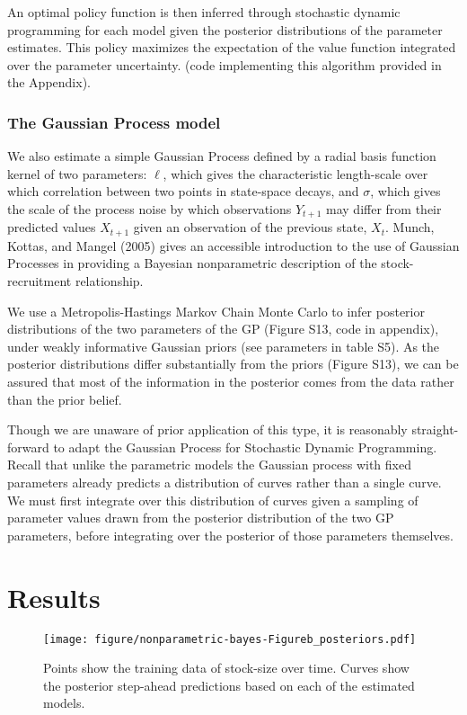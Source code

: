 \documentclass[author-year, review]{elsarticle} %
\makeatletter
\def\maxwidth{\ifdim\Gin@nat@width>\linewidth\linewidth
\else\Gin@nat@width\fi}
\let\Oldincludegraphics\includegraphics
\renewcommand{\includegraphics}[1]{\Oldincludegraphics[width=\maxwidth]{#1}}
\makeatother
\begin{document}
An optimal policy function is then inferred through stochastic dynamic
programming for each model given the posterior distributions of the
parameter estimates. This policy maximizes the expectation of the value
function integrated over the parameter uncertainty. (code implementing
this algorithm provided in the Appendix).

\subsubsection{The Gaussian Process
model}\label{the-gaussian-process-model}

We also estimate a simple Gaussian Process defined by a radial basis
function kernel of two parameters: $\ell$, which gives the
characteristic length-scale over which correlation between two points in
state-space decays, and $\sigma$, which gives the scale of the process
noise by which observations $Y_{t+1}$ may differ from their predicted
values $X_{t+1}$ given an observation of the previous state, $X_t$.
Munch, Kottas, and Mangel (2005) gives an accessible introduction to the
use of Gaussian Processes in providing a Bayesian nonparametric
description of the stock-recruitment relationship.

We use a Metropolis-Hastings Markov Chain Monte Carlo to infer posterior
distributions of the two parameters of the GP (Figure S13, code in
appendix), under weakly informative Gaussian priors (see parameters in
table S5). As the posterior distributions differ substantially from the
priors (Figure S13), we can be assured that most of the information in
the posterior comes from the data rather than the prior belief.

Though we are unaware of prior application of this type, it is
reasonably straight-forward to adapt the Gaussian Process for Stochastic
Dynamic Programming. Recall that unlike the parametric models the
Gaussian process with fixed parameters already predicts a distribution
of curves rather than a single curve. We must first integrate over this
distribution of curves given a sampling of parameter values drawn from
the posterior distribution of the two GP parameters, before integrating
over the posterior of those parameters themselves.

\section{Results}\label{results}

\begin{figure}[htbp]
\centering
\texttt{[image: figure/nonparametric-bayes-Figureb\_posteriors.pdf]}
\caption{Points show the training data of stock-size over time. Curves
show the posterior step-ahead predictions based on each of the estimated
models.}
\end{figure}
\end{document}
